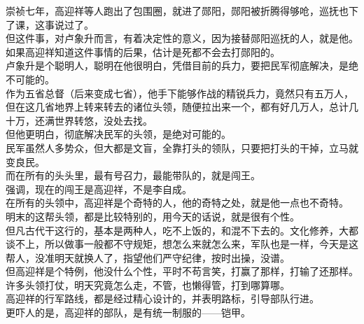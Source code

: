 \begin{multicols}{\theparacolNo}
崇祯七年，高迎祥等人跑出了包围圈，就进了郧阳，郧阳被折腾得够呛，巡抚也下了课，这事说过了。\\

但这件事，对卢象升而言，有着决定性的意义，因为接替郧阳巡抚的人，就是他。\\

如果高迎祥知道这件事情的后果，估计是死都不会去打郧阳的。\\

卢象升是个聪明人，聪明在他很明白，凭借目前的兵力，要把民军彻底解决，是绝不可能的。\\

作为五省总督（后来变成七省），他手下能够作战的精锐兵力，竟然只有五万人，但在这几省地界上转来转去的诸位头领，随便拉出来一个，都有好几万人，总计几十万，还满世界转悠，没处去找。\\

但他更明白，彻底解决民军的头领，是绝对可能的。\\

民军虽然人多势众，但大都是文盲，全靠打头的领队，只要把打头的干掉，立马就变良民。\\

而在所有的头头里，最有号召力，最能带队的，就是闯王。\\

强调，现在的闯王是高迎祥，不是李自成。\\

在所有的头领中，高迎祥是个奇特的人，他的奇特之处，就是他一点也不奇特。\\

明末的这帮头领，都是比较特别的，用今天的话说，就是很有个性。\\

但凡古代干这行的，基本是两种人，吃不上饭的，和混不下去的。文化修养，大都谈不上，所以做事一般都不守规矩，想怎么来就怎么来，军队也是一样，今天是这帮人，没准明天就换人了，指望他们严守纪律，按时出操，没谱。\\

但高迎祥是个特例，他没什么个性，平时不苟言笑，打赢了那样，打输了还那样。\\

许多头领打仗，明天究竟怎么走，不管，也懒得管，打到哪算哪。\\

高迎祥的行军路线，都是经过精心设计的，并表明路标，引导部队行进。\\

更吓人的是，高迎祥的部队，是有统一制服的——铠甲。\\


\end{multicols}
